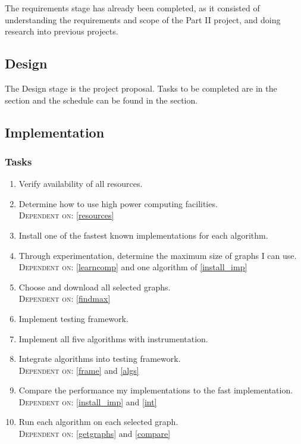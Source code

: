 \documentclass[a4paper,12pt]{article}
\begin{document}
The requirements stage has already been completed, as it consisted of understanding the requirements and scope of the Part II project, and doing research into previous projects.
\subsection{Design} 

The Design stage is the project proposal. Tasks to be completed are in the  section and the schedule can be found in the  section.

\subsection{Implementation} \label{implementation}

\subsubsection*{Tasks}
\begin{enumerate}[label=\arabic*.]
\item Verify availability of all resources.\label{resources}

\item Determine how to use high power computing facilities.\label{learncomp}\\
\textsc{Dependent on:} \ref{resources}

\item Install one of the fastest known implementations for each algorithm. \label{install_imp}

\item Through experimentation, determine the maximum size of graphs I can use.\\
 \textsc{Dependent on:} \ref{learncomp} and one algorithm of \ref{install_imp}  \label{findmax}
 
 \item Choose and download all selected graphs.\\ 
 \textsc{Dependent on:} \ref{findmax} \label{getgraphs}
 
\item Implement testing framework. \label{frame}

\item Implement all five algorithms with instrumentation.\label{algs}

\item Integrate algorithms into testing framework. \label{int}\\
\textsc{Dependent on:} \ref{frame} and \ref{algs}

\item Compare the performance my implementations to the fast implementation.\\
\textsc{Dependent on:} \ref{install_imp} and \ref{int} \label{compare}

\item Run each algorithm on each selected graph.\\
\textsc{Dependent on:} \ref{getgraphs} and \ref{compare} \label{run}
\end{enumerate}
\end{document}
